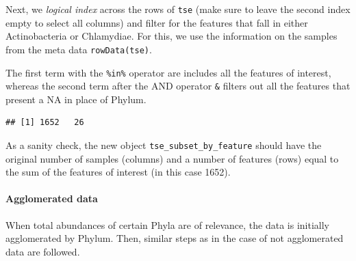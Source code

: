 \documentclass[
]{book}
\newenvironment{Shaded}{\begin{snugshade}}{\end{snugshade}}
\newcommand{\CommentTok}[1]{\textcolor[rgb]{0.56,0.35,0.01}{\textit{#1}}}
\newcommand{\FunctionTok}[1]{\textcolor[rgb]{0.00,0.00,0.00}{#1}}
\newcommand{\NormalTok}[1]{#1}
\newcommand{\OtherTok}[1]{\textcolor[rgb]{0.56,0.35,0.01}{#1}}
\newcommand{\SpecialCharTok}[1]{\textcolor[rgb]{0.00,0.00,0.00}{#1}}
\newcommand{\StringTok}[1]{\textcolor[rgb]{0.31,0.60,0.02}{#1}}
\begin{document}
Next, we \emph{logical index} across the rows of \texttt{tse} (make sure to leave
the second index empty to select all columns) and filter for the
features that fall in either Actinobacteria or Chlamydiae. For this,
we use the information on the samples from the meta data
\texttt{rowData(tse)}.

The first term with the \texttt{\%in\%} operator are includes all the features
of interest, whereas the second term after the AND operator \texttt{\&}
filters out all the features that present a NA in place of Phylum.

\begin{Shaded}
\end{Shaded}

\begin{verbatim}
## [1] 1652   26
\end{verbatim}

As a sanity check, the new object \texttt{tse\_subset\_by\_feature} should have the original number of samples (columns) and a number of features (rows) equal to the sum of the features of interest (in this case 1652).

\hypertarget{agglomerated-data}{%
\paragraph{Agglomerated data}\label{agglomerated-data}}

When total abundances of certain Phyla are of relevance, the data is initially agglomerated by Phylum. Then, similar steps as in the case of not agglomerated data are followed.
\end{document}
